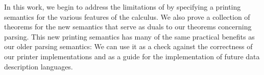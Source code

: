 In this work, we begin to address the limitations of
\ddcold{} by specifying a printing semantics for the
various features of the calculus.  We also
prove a collection of theorems for the new semantics that serve as
duals to our theorems concerning parsing.  This new printing semantics
has many of the same practical benefits as our older parsing 
semantics: We can
use it as a check against the correctness of our printer
implementations and as a guide for the
implementation of future data description languages.  





